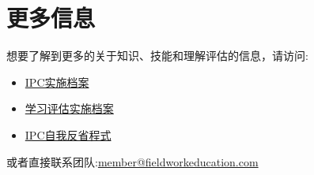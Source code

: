 \section{更多信息}
     想要了解到更多的关于知识、技能和理解评估的信息，请访问:
     \begin{itemize}
       \item  \href{https://members.greatlearning.com/ipc/documents?category=31}{IPC实施档案}
       \item  \href{https://members.greatlearning.com/ipc/assess/aflfile}{学习评估实施档案}
       \item  \href{https://members.greatlearning.com/ipc/bottomline9/}{IPC自我反省程式}
     \end{itemize}  
     \par
     或者直接联系团队:\underline{member@fieldworkeducation.com}
